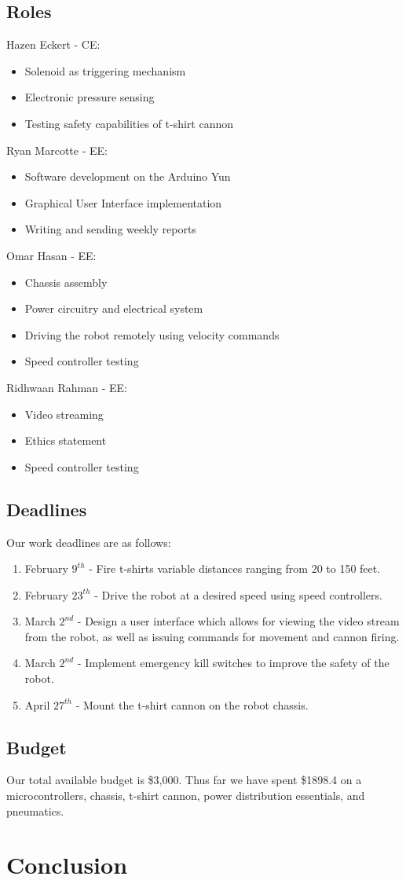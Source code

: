 \documentclass[letterpaper,12pt]{article}
\begin{document}
\subsection{Roles}
Hazen Eckert - CE:
\begin{itemize}
\item Solenoid as triggering  mechanism
\item Electronic pressure sensing 
\item Testing safety capabilities of t-shirt cannon
\end{itemize}
Ryan Marcotte - EE:
\begin{itemize}
\item Software development on the Arduino Yun
\item Graphical User Interface implementation
\item Writing and sending weekly reports
\end{itemize}


Omar Hasan - EE:
\begin{itemize}
\item Chassis assembly
\item Power circuitry and electrical system
\item Driving the robot remotely using velocity commands
\item Speed controller testing
\end{itemize}
Ridhwaan Rahman - EE:
\begin{itemize}
\item Video streaming
\item Ethics statement
\item Speed controller testing
\end{itemize}
\subsection{Deadlines}
Our work deadlines are as follows:
\begin{enumerate}
\item February $9^{th}$ - Fire t-shirts variable distances ranging from 20 to 150 feet.
\item February $23^{th}$ - Drive the robot at a desired speed using speed controllers.
\item March $2^{nd}$ - Design a user interface which allows for viewing the video stream from the robot, as well as issuing commands for movement and cannon firing.
\item March $2^{nd}$ - Implement emergency kill switches to improve the safety of the robot.
\item April $27^{th}$ - Mount the t-shirt cannon on the robot chassis.
\end{enumerate}
\subsection{Budget}
Our total available budget is \$3,000. Thus far we have spent \$1898.4 on a microcontrollers,
chassis, t-shirt cannon, power distribution essentials, and pneumatics.
\section{Conclusion}
\end{document}
